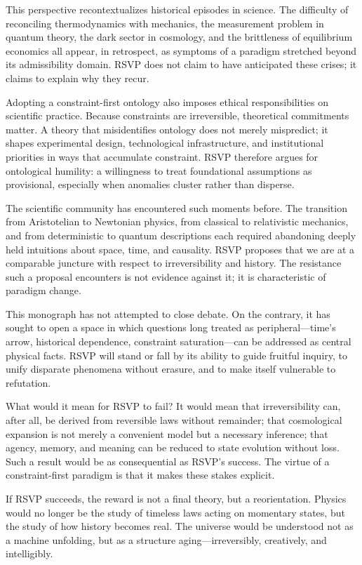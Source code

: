 \documentclass[11pt,oneside]{book}
\begin{document}
This perspective recontextualizes historical episodes in science. The difficulty of reconciling thermodynamics with mechanics, the measurement problem in quantum theory, the dark sector in cosmology, and the brittleness of equilibrium economics all appear, in retrospect, as symptoms of a paradigm stretched beyond its admissibility domain. RSVP does not claim to have anticipated these crises; it claims to explain why they recur.

Adopting a constraint-first ontology also imposes ethical responsibilities on scientific practice. Because constraints are irreversible, theoretical commitments matter. A theory that misidentifies ontology does not merely mispredict; it shapes experimental design, technological infrastructure, and institutional priorities in ways that accumulate constraint. RSVP therefore argues for ontological humility: a willingness to treat foundational assumptions as provisional, especially when anomalies cluster rather than disperse.

The scientific community has encountered such moments before. The transition from Aristotelian to Newtonian physics, from classical to relativistic mechanics, and from deterministic to quantum descriptions each required abandoning deeply held intuitions about space, time, and causality. RSVP proposes that we are at a comparable juncture with respect to irreversibility and history. The resistance such a proposal encounters is not evidence against it; it is characteristic of paradigm change.

This monograph has not attempted to close debate. On the contrary, it has sought to open a space in which questions long treated as peripheral—time’s arrow, historical dependence, constraint saturation—can be addressed as central physical facts. RSVP will stand or fall by its ability to guide fruitful inquiry, to unify disparate phenomena without erasure, and to make itself vulnerable to refutation.

What would it mean for RSVP to fail? It would mean that irreversibility can, after all, be derived from reversible laws without remainder; that cosmological expansion is not merely a convenient model but a necessary inference; that agency, memory, and meaning can be reduced to state evolution without loss. Such a result would be as consequential as RSVP’s success. The virtue of a constraint-first paradigm is that it makes these stakes explicit.

If RSVP succeeds, the reward is not a final theory, but a reorientation. Physics would no longer be the study of timeless laws acting on momentary states, but the study of how history becomes real. The universe would be understood not as a machine unfolding, but as a structure aging—irreversibly, creatively, and intelligibly.
\end{document}
